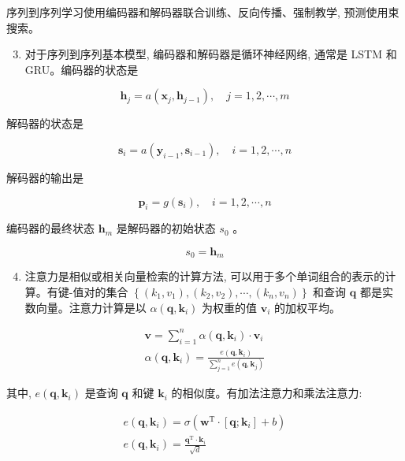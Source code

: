 \documentclass[10pt]{article}
\begin{document}
序列到序列学习使用编码器和解码器联合训练、反向传播、强制教学, 预测使用束搜索。

\begin{enumerate}
  \setcounter{enumi}{2}
  \item 对于序列到序列基本模型, 编码器和解码器是循环神经网络, 通常是 LSTM 和 GRU。编码器的状态是
\end{enumerate}

$$
\boldsymbol{h}_{j}=a\left(\boldsymbol{x}_{j}, \boldsymbol{h}_{j-1}\right), \quad j=1,2, \cdots, m
$$

解码器的状态是

$$
\boldsymbol{s}_{i}=a\left(\boldsymbol{y}_{i-1}, \boldsymbol{s}_{i-1}\right), \quad i=1,2, \cdots, n
$$

解码器的输出是

$$
\boldsymbol{p}_{i}=g\left(\boldsymbol{s}_{i}\right), \quad i=1,2, \cdots, n
$$

编码器的最终状态 $\boldsymbol{h}_{m}$ 是解码器的初始状态 $s_{0}$ 。

$$
s_{0}=\boldsymbol{h}_{m}
$$

\begin{enumerate}
  \setcounter{enumi}{3}
  \item 注意力是相似或相关向量检索的计算方法, 可以用于多个单词组合的表示的计算。有键-值对的集合 $\left\{\left(k_{1}, v_{1}\right),\left(k_{2}, v_{2}\right), \cdots,\left(k_{n}, v_{n}\right)\right\}$ 和查询 $\boldsymbol{q}$ 都是实数向量。注意力计算是以 $\alpha\left(\boldsymbol{q}, \boldsymbol{k}_{i}\right)$ 为权重的值 $\boldsymbol{v}_{i}$ 的加权平均。
\end{enumerate}

$$
\begin{array}{r}
\boldsymbol{v}=\sum_{i=1}^{n} \alpha\left(\boldsymbol{q}, \boldsymbol{k}_{i}\right) \cdot \boldsymbol{v}_{i} \\
\alpha\left(\boldsymbol{q}, \boldsymbol{k}_{i}\right)=\frac{e\left(\boldsymbol{q}, \boldsymbol{k}_{i}\right)}{\sum_{j=1}^{n} e\left(\boldsymbol{q}, \boldsymbol{k}_{j}\right)}
\end{array}
$$

其中, $e\left(\boldsymbol{q}, \boldsymbol{k}_{i}\right)$ 是查询 $\boldsymbol{q}$ 和键 $\boldsymbol{k}_{i}$ 的相似度。有加法注意力和乘法注意力:

$$
\begin{gathered}
e\left(\boldsymbol{q}, \boldsymbol{k}_{i}\right)=\sigma\left(\boldsymbol{w}^{\mathrm{T}} \cdot\left[\boldsymbol{q} ; \boldsymbol{k}_{i}\right]+b\right) \\
e\left(\boldsymbol{q}, \boldsymbol{k}_{i}\right)=\frac{\boldsymbol{q}^{\mathrm{T}} \cdot \boldsymbol{k}_{i}}{\sqrt{d}}
\end{gathered}
$$
\end{document}
